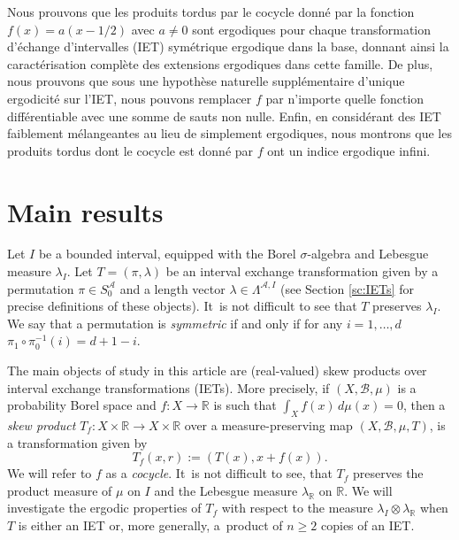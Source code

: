 \documentclass[JEP,XML,SOM,Unicode,NoEqCountersInSection,NoFloatCountersInSection,published]{cedram}
\theoremstyle{plain}
\theoremstyle{definition}
\newcommand{\R}{\mathbb{R}}
\begin{document}

\begin{altabstract}
Nous prouvons que les produits tordus par le cocycle donné par la fonction $f(x)=a(x-1/2)$ avec $a\neq 0$ sont ergodiques pour chaque transformation d'échange d'intervalles (IET) symétrique ergodique dans la base, donnant ainsi la caractérisation complète des extensions ergodiques dans cette famille. De plus, nous prouvons que sous une hypothèse naturelle supplémentaire d'unique ergodicité sur l'IET, nous pouvons remplacer $f$ par n'importe quelle fonction différentiable avec une somme de sauts non nulle. Enfin, en considérant des IET faiblement mélangeantes au lieu de simplement ergodiques, nous montrons que les produits tordus dont le cocycle est donné par $f$ ont un indice ergodique infini.
\end{altabstract}

\maketitle

\tableofcontents
\mainmatter

\section{Main results}
Let $I$ be a bounded interval, equipped with the Borel $\sigma$-algebra and Lebesgue measure $\lambda_{I}$. Let $T=(\pi,\lambda)$ be an interval exchange transformation given by a permutation $\pi\in S_0^\mathcal A$ and a length vector $\lambda\in\Lambda^{\mathcal A,I}$
{(see Section \ref{sc:IETs} for precise definitions of these objects)}. It~is not difficult to see that $T$ preserves $\lambda_{I}$. We say that a permutation is \emph{symmetric} if and only if for any $i = 1, \dots, d$ $\pi_1\circ\pi_0^{-1}(i)=d+1-i$.

The main objects of study in this article are (real-valued) skew products over interval exchange transformations (IETs). More precisely, if $(X,\mathcal B,\mu)$ is a probability Borel space and $f:X\to \R$ is such that $\int_X f(x)\,d\mu(x)=0$, then a \emph{skew product} $T_f:X\times \R\to X\times \R$ over a measure-preserving map $(X,\mathcal B,\mu,T)$, is a transformation given by
\[
T_f(x,r):=(T(x),x+f(x)).
\]
We will refer to $f$ as a \emph{cocycle}. It~is not difficult to see, that $T_f$ preserves the product measure of $\mu$ on $I$ and the Lebesgue measure $\lambda_{\R}$ on $\R$. We will investigate the ergodic properties of $T_f$ with respect to the measure $\lambda_I\otimes\lambda_{\R}$ when $T$ is either an IET or, more generally, a~product of $n \ge 2$ copies of an IET.
\end{document}
